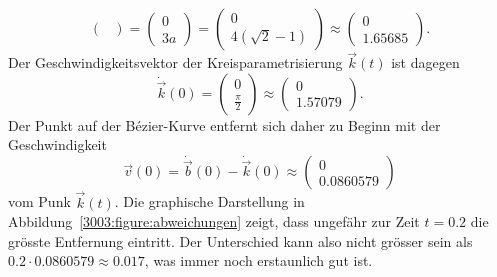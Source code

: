 \begin{loesung}
\begin{teilaufgaben}
\[\begin{pmatrix}
\end{pmatrix}
=
\begin{pmatrix}
0\\
3a
\end{pmatrix}
=
\begin{pmatrix}
0
\\
4(\sqrt{2}-1)
\end{pmatrix}
\approx
\begin{pmatrix}
0
\\
1.65685
\end{pmatrix}.
\]
Der Geschwindigkeitsvektor der Kreisparametrisierung $\vec{k}(t)$ ist
%
dagegen
\[
\dot{\vec{k}}(0)
=
\begin{pmatrix}
0\\\frac\pi2
\end{pmatrix}
\approx
\begin{pmatrix}
0\\
1.57079
\end{pmatrix}.
\]
Der Punkt auf der Bézier-Kurve entfernt sich daher zu Beginn mit der
Geschwindigkeit
\[
\vec{v}(0)
=
\dot{\vec{b}}(0) - \dot{\vec{k}}(0)
\approx
\begin{pmatrix}
0
\\
0.0860579
\end{pmatrix}
\]
vom Punk $\vec{k}(t)$.
Die graphische Darstellung in Abbildung~\ref{3003:figure:abweichungen}
zeigt, dass ungefähr zur Zeit $t=0.2$ die grösste Entfernung eintritt.
Der Unterschied kann also nicht grösser sein als
$0.2\cdot 0.0860579\approx 0.017$, was immer noch erstaunlich gut ist.
\qedhere
\end{teilaufgaben}
\end{loesung}
